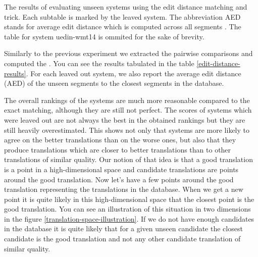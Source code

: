 \begin{table}
\caption[Results of evaluating unseen systems by edit distance matching]{The results of
  evaluating unseen systems using the edit distance matching and
   trick. Each subtable is marked by the leaved system.
  The abbreviation AED stands for average edit distance which is computed
across all segments . The table for system uedin-wmt14 is ommited for the sake
of brevity.}

  \label{edit-distance-results}
\end{table}

Similarly to the previous experiment we extracted the pairwise comparisons and
computed the . You can see the results
tabulated in the table \ref{edit-distance-results}. For each leaved out system,
we also report the average edit distance (AED) of the unseen segments to the closest
segments in the database.

The overall rankings of the systems are much more reasonable compared to the
exact matching, although they are still not perfect. The scores of systems
which were leaved out are not always the best in the obtained rankings but they
are still heavily overestimated. This shows not only that systems are more
likely to agree on the better translations than on the worse ones, but also
that they produce translations which are closer to better translations than to
other translations of similar quality. Our notion of that idea is that a good
translation is a point  in a high-dimensional space and candidate translations
are points around the good translation. Now let's have a few points around the
good translation representing the translations in the database. When we get a
new point it is quite likely in this high-dimensional space that the closest
point is the good translation. You can see an illustration of this situation in
two dimensions in the figure \ref{translation-space-illustration}.  If we do not have enough candidates in the
database it is quite likely that for a given unseen candidate the closest
candidate is the good translation and not any other candidate translation of
similar quality. 


